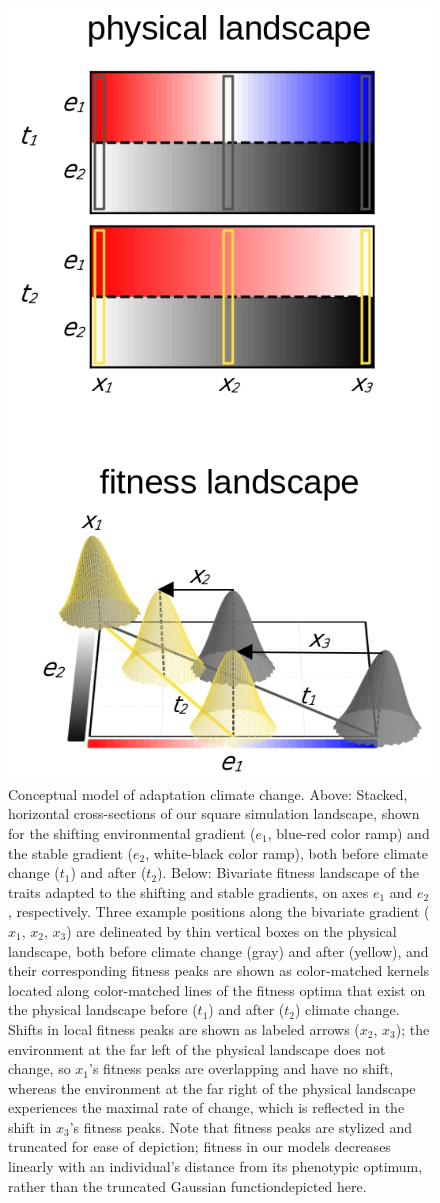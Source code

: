 \documentclass[9pt,twocolumn,twoside,lineno]{pnas-new}
\begin{document}
\begin{figure}%
\centering
\includegraphics[width=.8\linewidth]{pub/figs/FIG_1_conceptual.jpg}
    \caption{Conceptual model of adaptation climate change. Above: Stacked, horizontal cross-sections of our square simulation landscape, shown for the shifting environmental gradient ($e_{1}$, blue-red color ramp) and the stable gradient ($e_{2}$, white-black color ramp), both before climate change ($t_{1}$) and after ($t_{2}$). Below: Bivariate fitness landscape of the traits adapted to the shifting and stable gradients, on axes $e_{1}$ and $e_{2}$, respectively. Three example positions along the bivariate gradient ($x_{1}$, $x_{2}$, $x_{3}$) are delineated by thin vertical boxes on the physical landscape, both before climate change (gray) and after (yellow), and their corresponding fitness peaks are shown as color-matched kernels located along color-matched lines of the fitness optima that exist on the physical landscape before ($t_{1}$) and after ($t_{2}$) climate change. Shifts in local fitness peaks are shown as labeled arrows ($x_{2}$, $x_{3}$); the environment at the far left of the physical landscape does not change, so $x_{1}$'s fitness peaks are overlapping and have no shift, whereas the environment at the far right of the physical landscape experiences the maximal rate of change, which is reflected in the shift in $x_{3}$'s fitness peaks. Note that fitness peaks are stylized and truncated for ease of depiction; fitness in our models decreases linearly with an individual's distance from its phenotypic optimum, rather than the truncated Gaussian functiondepicted here.}

\end{figure}
\end{document}
